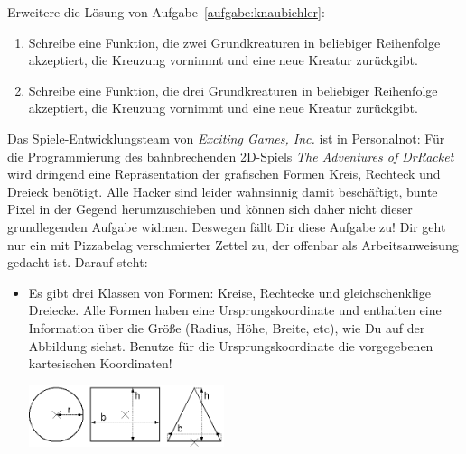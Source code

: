 \begin{aufgabe}
  \label{aufgabe:knaubichler2}
  Erweitere die Lösung von Aufgabe~\ref{aufgabe:knaubichler}:
  
  \begin{enumerate}
  \item Schreibe eine Funktion, die zwei
    Grundkreaturen in beliebiger Reihenfolge akzeptiert, die Kreuzung
    vornimmt und eine neue Kreatur zurückgibt.
    
  \item Schreibe eine
    Funktion, die drei Grundkreaturen in beliebiger Reihenfolge
    akzeptiert, die Kreuzung vornimmt und eine neue Kreatur
    zurückgibt.
  \end{enumerate}
\end{aufgabe}     

\begin{aufgabe}

  Das Spiele-Entwicklungsteam von
  \textit{Exciting Games, Inc.} ist in Personalnot: Für die
  Programmierung des bahnbrechenden 2D-Spiels \textit{The Adventures
    of DrRacket} wird dringend eine Repräsentation der grafischen
  Formen Kreis, Rechteck und Dreieck benötigt.  Alle Hacker
  sind leider wahnsinnig damit beschäftigt, bunte Pixel in der Gegend
  herumzuschieben und können sich daher nicht dieser grundlegenden
  Aufgabe widmen.  Deswegen fällt Dir diese Aufgabe zu!  Dir geht
  nur ein mit Pizzabelag verschmierter Zettel zu, der offenbar als
  Arbeitsanweisung gedacht ist.  Darauf steht:
  \begin{itemize}

  \item Es gibt drei Klassen von Formen: Kreise, Rechtecke und
    gleichschenklige Dreiecke.  Alle Formen haben eine
    Ursprungskoordinate und enthalten eine Information über die Größe
    (Radius, Höhe, Breite, etc), wie Du auf der Abbildung siehst.
    Benutze für die Ursprungskoordinate die vorgegebenen kartesischen
    Koordinaten!

    \begin{center}
      \includegraphics[height=1.8cm]{gemischte-daten/shapes.png}
    \end{center}


\end{itemize}
\end{aufgabe}
